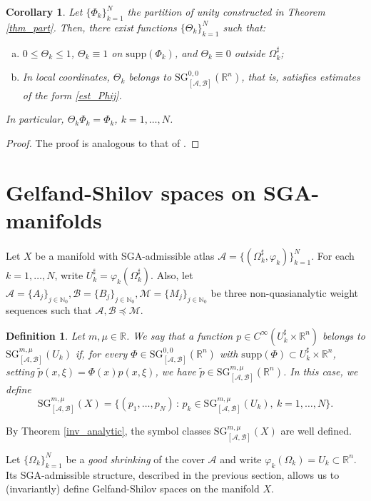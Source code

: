 \documentclass[11pt,reqno]{amsart}
\numberwithin{equation}{section}
\newtheorem{definition}[theorem]{Definition}
\newtheorem{corollary}[theorem]{Corollary}
\newcommand{\R}{{\mathbb{R}}} %
\newcommand{\SG}{{\mathrm{SG}}}
\newcommand{\Mj}{{\{M_j\}_{j\in\mathbb{N}_0}}} %
\newcommand{\Aj}{{\{A_j\}_{j\in\mathbb{N}_0}}} %
\newcommand{\Bj}{{\{B_j\}_{j\in\mathbb{N}_0}}} %
\newcommand{\M}{{\mathcal{M}}} %
\newcommand{\A}{{\mathcal{A}}} %
\newcommand{\B}{{\mathcal{B}}} %
\begin{document}
\begin{corollary}\label{coro_Theta}
	Let $\{\Phi_k\}_{k=1}^N$ the partition of unity constructed in Theorem \ref{thm_part}. Then, there exist functions $\{\Theta_k\}_{k=1}^N$ such that:
	\begin{enumerate}[(a)]
		\item $0\leq \Theta_k\leq 1$, $\Theta_k\equiv 1$ on $\mathrm{supp}(\Phi_k)$, and $\Theta_k\equiv 0$ outside $\Omega_k^\sharp$;
		\item In local coordinates, $\Theta_k$ belongs to $ {\SG}_{[\A,\B]}^{0,0}(\mathbb{R}^n)$, that is, satisfies estimates of the form \eqref{est_Phij}.
	\end{enumerate}
	In particular, $\Theta_k\Phi_k=\Phi_k$, $k=1,\dots,N$.
\end{corollary}
%
\begin{proof}
	The proof is analogous to that of \cite[Lemma 3.10]{Schrohe86}.
\end{proof}


\section{Gelfand-Shilov spaces on SGA-manifolds}\label{sec:GSspcsGSAmf}


Let $X$ be a manifold with SGA-admissible atlas $\mathscr{A}=\{(\Omega_k^\sharp,\varphi_k)\}_{k=1}^N$. For each $k=1,\dots,N$, 
write $U_k^\sharp = \varphi_k(\Omega_k^\sharp)$. Also, let $\A=\Aj,\B=\Bj,\M=\Mj$ be three non-quasianalytic weight sequences 
such that $\A,\B\preceq\M$.
%
\begin{definition}
	Let $m,\mu\in\mathbb{R}$. We say that a function $p\in C^\infty(U_k^\sharp\times\mathbb{R}^n)$ belongs to ${\SG}_{[\A,\B]}^{m,\mu}(U_k)$ if, 
	for every $\Phi\in {\SG}_{[\A,\B]}^{0,0}(\mathbb{R}^n)$ with $\mathrm{supp}(\Phi)\subset U_k^\sharp\times\R^n$, setting $\tilde{p}(x,\xi)=\Phi(x)p(x,\xi)$,
	we have $\tilde{p}\in {\SG}_{[\A,\B]}^{m,\mu}(\mathbb{R}^n)$. In this case, we define 
	\[{\SG}_{[\A,\B]}^{m,\mu}(X)=\{(p_1,\dots,p_N)\,:\, p_k\in {\SG}_{[\A,\B]}^{m,\mu}(U_k),\ k=1,\dots,N\}.\]
\end{definition}

By Theorem \ref{inv_analytic}, the symbol classes ${\SG}_{[\A,\B]}^{m,\mu}(X)$ are well defined.

Let $\{\Omega_k\}_{k=1}^N$ be a \textit{good shrinking} of the cover $\mathscr{A}$ and write $\varphi_k(\Omega_k) = U_k\subset\mathbb{R}^n$. 
Its SGA-admissible structure, described in the previous section, allows us to (invariantly) define Gelfand-Shilov spaces on the manifold $X$.
\end{document}
